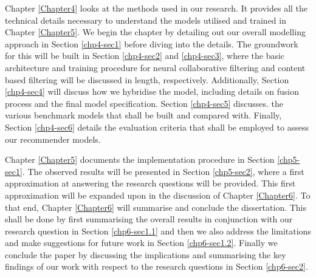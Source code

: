 Chapter \ref{Chapter4} looks at the methods used in our research. It provides all the technical details necessary to understand the models utilised and trained in Chapter \ref{Chapter5}. We begin the chapter by detailing out our overall modelling approach in Section \ref{chp4-sec1} before diving into the details. The groundwork for this will be built in Section \ref{chp4-sec2} and \ref{chp4-sec3}, where the basic architecture and training procedure for neural collaborative filtering and content based filtering will be discussed in length, respectively. Additionally, Section \ref{chp4-sec4} will discuss how we hybridise the model, including details on fusion process and the final model specification. Section \ref{chp4-sec5} discusses. the various benchmark models that shall be built and compared with. Finally, Section \ref{chp4-sec6} details the evaluation criteria that shall be employed to assess our recommender models. 

Chapter \ref{Chapter5} documents the implementation procedure in Section \ref{chp5-sec1}. The observed results will be presented in Section \ref{chp5-sec2}, where a first approximation at answering the research questions will be provided. This first approximation will be expanded upon in the discussion of Chapter \ref{Chapter6}. To that end, Chapter \ref{Chapter6} will summarise and conclude the dissertation. This shall be done by first summarising the overall results in conjunction with our research question in Section \ref{chp6-sec1.1} and then we also address the limitations and make suggestions for future work in Section \ref{chp6-sec1.2}. Finally we conclude the paper by discussing the implications and summarising the key findings of our work with respect to the research questions in Section \ref{chp6-sec2}.




